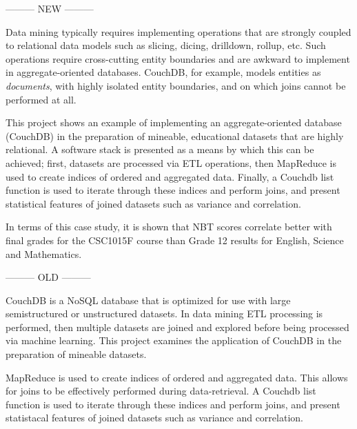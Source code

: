 --------- NEW ---------

Data mining typically requires implementing operations that are strongly coupled to relational data models such as slicing, dicing, drilldown, rollup, etc. Such operations require cross-cutting entity boundaries and are awkward to implement in aggregate-oriented databases. CouchDB, for example, models entities as \textit{documents}, with highly isolated entity boundaries, and on which joins cannot be performed at all.

This project shows an example of implementing an aggregate-oriented database (CouchDB) in the preparation of mineable, educational datasets that are highly relational. A software stack is presented as a means by which this can be achieved; first, datasets are processed via ETL operations, then MapReduce is used to create indices of ordered and aggregated data. Finally, a Couchdb list function is used to iterate through these indices and perform joins, and present statistical features of joined datasets such as variance and correlation.

In terms of this case study, it is shown that NBT scores correlate better with final grades for the CSC1015F course than Grade 12 results for English, Science and Mathematics.


--------- OLD ---------

CouchDB is a NoSQL database that is optimized for use with large semistructured or unstructured datasets. In data mining ETL processing is performed, then multiple datasets are joined and explored before being processed via machine learning. This project examines the application of CouchDB in the preparation of mineable datasets.

MapReduce is used to create indices of ordered and aggregated data. This allows for joins to be effectively performed during data-retrieval. A Couchdb list function is used to iterate through these indices and perform joins, and present statistacal features of joined datasets such as variance and correlation.